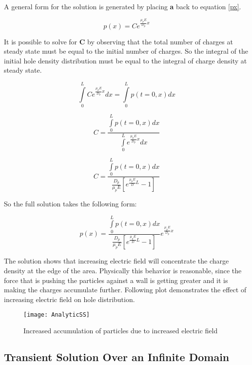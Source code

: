  A general form for the solution is generated by placing \textbf{a} back to equation \eqref{px}.
 
\begin{equation}
p(x)=Ce^{\frac{\mu_{p} E}{D_{p}}x}
\end{equation}

It is possible to solve for \textbf{C} by observing that the total number of charges at steady state must be equal to the initial number of charges. So the integral of the initial hole density distribution must be equal to the integral of charge density at steady state.


\begin{equation}\nonumber
\int\limits_{0}^{L}Ce^{\frac{\mu_{p} E}{D_{p}}x}dx=\int\limits_{0}^{L}p(t=0,x)dx
\end{equation}

\begin{equation}\nonumber
C=\frac{\int\limits_{0}^{L}p(t=0,x)dx}{\int\limits_{0}^{L}e^{\frac{\mu_{p} E}{D_{p}}x}dx}
\end{equation}

\begin{equation}
C=\frac{\int\limits_{0}^{L}p(t=0,x)dx}{\frac{D_p}{\mu_p E}[e^{\frac{\mu_p E}{D} L} -1]}
\end{equation}

So the full solution takes the following form:

\begin{equation}
p(x)=\frac{\int\limits_{0}^{L}p(t=0,x)dx}{\frac{D_p}{\mu_p E}[e^{\frac{\mu_p E}{D}L} -1]}e^{\frac{\mu_{p} E}{D_{p}}x}
\end{equation}

The solution shows that increasing electric field will concentrate the charge density at the edge of the area. Physically this behavior is reasonable, since the force that is pushing the particles against a wall is getting greater and it is making the charges accumulate further. Following plot demonstrates the effect of increasing electric field on hole distribution.

\begin{figure}[!htp]
\centering
\texttt{[image: AnalyticSS]}
\caption{Increased accumulation of particles due to increased electric field} 
\end{figure}

\clearpage
\subsection{Transient Solution Over an Infinite Domain}

